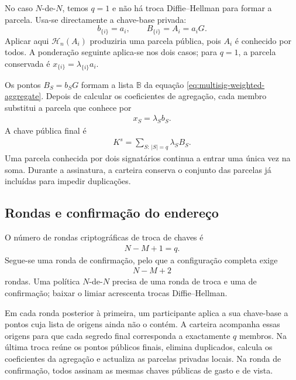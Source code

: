 No caso \(N\)-de-\(N\), temos \(q=1\) e não há troca Diffie--Hellman para
formar a parcela. Usa-se directamente a chave-base privada:%
\[
 b_{\{i\}}=a_i,\qquad B_{\{i\}}=A_i=a_iG.
\]
Aplicar aqui \(\mathcal H_n(A_i)\) produziria uma parcela pública, pois
\(A_i\) é conhecido por todos. A ponderação seguinte aplica-se nos dois casos;
para \(q=1\), a parcela conservada é \(x_{\{i\}}=\lambda_{\{i\}}a_i\).

Os pontos \(B_S=b_SG\) formam a lista \(\mathbb B\) da
equação \eqref{eq:multisig-weighted-aggregate}. Depois de calcular os
coeficientes de agregação, cada membro substitui a parcela que conhece por
\begin{align*}
 x_S=\lambda_Sb_S.
\end{align*}
A chave pública final é
\begin{align*}
 K^s=\sum_{S:\,|S|=q}\lambda_SB_S.
\end{align*}
Uma parcela conhecida por dois signatários continua a entrar uma única vez na
soma. Durante a assinatura, a carteira conserva o conjunto das parcelas já
incluídas para impedir duplicações.

\subsection{Rondas e confirmação do endereço}

O número de rondas criptográficas de troca de chaves é
\begin{align*}
 N-M+1=q.
\end{align*}
%
Segue-se uma ronda de confirmação, pelo que a configuração completa exige
\begin{align*}
 N-M+2
\end{align*}
rondas. Uma política \(N\)-de-\(N\) precisa de uma ronda de troca e uma de
confirmação; baixar o limiar acrescenta trocas Diffie--Hellman.

%
Em cada ronda posterior à primeira, um participante aplica a sua chave-base a
pontos cuja lista de origens ainda não o contém. A carteira acompanha essas
origens para que cada segredo final corresponda a exactamente \(q\) membros.
Na última troca reúne os pontos públicos finais, elimina duplicados, calcula
os coeficientes da agregação e actualiza as parcelas privadas locais. Na ronda
de confirmação, todos assinam as mesmas chaves públicas de gasto e de vista.

